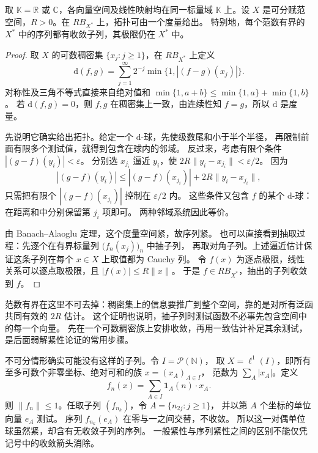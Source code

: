 \begin{theorem}\label{b1:thm:weak-star-metrizable}
取 \(\mathbb K=\mathbb R\) 或 \(\mathbb C\)，各向量空间及线性映射均在同一标量域 \(\mathbb K\) 上。设 \(X\) 是可分赋范空间，\(R>0\)。在 \(RB_{X^*}\) 上，\WeakStar{}拓扑可由一个度量给出。
特别地，每个范数有界的 \(X^*\) 中的序列都有\WeakStar{}收敛子列，其极限仍在 \(X^*\) 中。
\end{theorem}
\begin{proof}
取 \(X\) 的可数稠密集 \(\{x_j:j\geq1\}\)，在 \(RB_{X^*}\) 上定义
\[
 \mathrm{d}(f,g)=\sum_{j=1}^{\infty}2^{-j}\min\{1,|(f-g)(x_j)|\}.
\]
对称性及三角不等式直接来自绝对值和
\(\min\{1,a+b\}\leq\min\{1,a\}+\min\{1,b\}\)。
若 \(\mathrm{d}(f,g)=0\)，则 \(f,g\) 在稠密集上一致，由连续性知 \(f=g\)，所以 \(\mathrm{d}\) 是度量。

先说明它确实给出\WeakStar{}拓扑。给定一个 \(\mathrm{d}\)-球，先使级数尾和小于半个半径，
再限制前面有限多个测试值，就得到包含在球内的\WeakStar{}邻域。
反过来，考虑有限个条件 \(|(g-f)(y_i)|<\varepsilon\)。
分别选 \(x_{j_i}\) 逼近 \(y_i\)，使 \(2R\|y_i-x_{j_i}\|<\varepsilon/2\)。
因为
\[
 |(g-f)(y_i)|\leq |(g-f)(x_{j_i})|+2R\|y_i-x_{j_i}\|,
\]
只需把有限个 \(|(g-f)(x_{j_i})|\) 控制在 \(\varepsilon/2\) 内。
这些条件又包含 \(f\) 的某个 \(\mathrm{d}\)-球：在距离和中分别保留第 \(j_i\) 项即可。
两种邻域系统因此等价。

由 Banach--Alaoglu 定理，这个度量空间紧，故序列紧。
也可以直接看到抽取过程：先逐个在有界标量列 \(\bigl(f_n(x_j)\bigr)_n\) 中抽子列，
再取对角子列。上述逼近估计保证这条子列在每个 \(x\in X\) 上取值都为 Cauchy 列。
令 \(f(x)\) 为逐点极限，线性关系可以逐点取极限，且 \(|f(x)|\leq R\|x\|\)。
于是 \(f\in RB_{X^*}\)，抽出的子列\WeakStar{}收敛到 \(f\)。
\end{proof}

范数有界在这里不可去掉：稠密集上的信息要推广到整个空间，靠的是对所有泛函共同有效的 \(2R\) 估计。
这个证明也说明，抽子列时测试函数不必事先包含空间中的每一个向量。
先在一个可数稠密族上安排收敛，再用一致估计补足其余测试，是后面弱解紧性论证的常用步骤。

\ProseParagraphBreak

不可分情形确实可能没有这样的子列。令 \(I=\mathcal P(\mathbb N)\)，
取 \(X=\ell^1(I)\)，即所有至多可数个非零坐标、绝对可和的族 \(x=(x_A)_{A\in I}\)，
范数为 \(\sum_A|x_A|\)。定义
\[
 f_n(x)=\sum_{A\in I}\mathbf1_A(n)\cdot x_A.
\]
则 \(\|f_n\|\leq1\)。任取子列 \((f_{n_k})\)，令 \(A=\{n_{2j}:j\geq1\}\)，
并以第 \(A\) 个坐标的单位向量 \(e_A\) 测试。
序列 \(f_{n_k}(e_A)\) 在零与一之间交替，不收敛。
所以这一对偶单位球虽然\WeakStar{}紧，却含有无\WeakStar{}收敛子列的序列。
一般紧性与序列紧性之间的区别不能仅凭记号中的收敛箭头消除。
